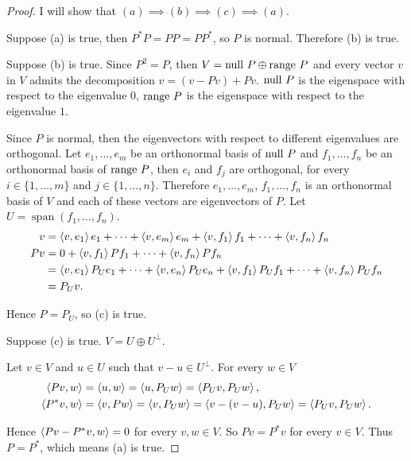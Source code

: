 \begin{proof}
    I will show that $(a) \implies (b) \implies (c) \implies (a)$.

    Suppose (a) is true, then $P^{*}P = PP = PP^{*}$, so $P$ is normal. Therefore (b) is true.

    Suppose (b) is true. Since $P^{2} = P$, then $V = \operatorname{null}\,{P}\oplus\operatorname{range}\,{P}$ and every vector $v$ in $V$ admits the decomposition $v = (v - Pv) + Pv$. $\operatorname{null}\,{P}$ is the eigenspace with respect to the eigenvalue $0$, $\operatorname{range}\,{P}$ is the eigenspace with respect to the eigenvalue $1$.

    Since $P$ is normal, then the eigenvectors with respect to different eigenvalues are orthogonal. Let $e_{1}, \ldots, e_{m}$ be an orthonormal basis of $\operatorname{null}\,{P}$ and $f_{1}, \ldots, f_{n}$ be an orthonormal basis of $\operatorname{range}\,{P}$, then $e_{i}$ and $f_{j}$ are orthogonal, for every $i\in\{1,\ldots, m\}$ and $j\in\{ 1,\ldots,n \}$. Therefore $e_{1}, \ldots, e_{m}$, $f_{1}, \ldots, f_{n}$ is an orthonormal basis of $V$ and each of these vectors are eigenvectors of $P$. Let $U = \operatorname{span}(f_{1}, \ldots, f_{n})$.
    \begin{align*}
        v  & = \left\langle{v,e_{1}}\right\rangle e_{1} + \cdots + \left\langle{v,e_{m}}\right\rangle e_{m} + \left\langle{v, f_{1}}\right\rangle f_{1} + \cdots + \left\langle{v, f_{n}}\right\rangle f_{n}                       \\
        Pv & = 0 + \left\langle{v, f_{1}}\right\rangle Pf_{1} + \cdots + \left\langle{v, f_{n}}\right\rangle Pf_{n}                                                                                \\
           & = \left\langle{v, e_{1}}\right\rangle P_{U}e_{1} + \cdots + \left\langle{v, e_{n}}\right\rangle P_{U}e_{n} + \left\langle{v, f_{1}}\right\rangle P_{U}f_{1} + \cdots + \left\langle{v, f_{n}}\right\rangle P_{U}f_{n} \\
           & = P_{U}v.
    \end{align*}

    Hence $P = P_{U}$, so (c) is true.

    Suppose (c) is true. $V = U\oplus U^{\bot}$.

    Let $v\in V$ and $u\in U$ such that $v - u\in U^{\bot}$. For every $w\in V$
    \begin{align*}
        \left\langle{Pv, w}\right\rangle     & = \left\langle{u, w}\right\rangle = \left\langle{u, P_{U}w}\right\rangle = \left\langle{P_{U}v, P_{U}w}\right\rangle,  \\
        \left\langle{P^{*}v, w}\right\rangle & = \left\langle{v, Pw}\right\rangle = \left\langle{v, P_{U}w}\right\rangle = \left\langle{v - (v - u), P_{U}w}\right\rangle = \left\langle{P_{U}v, P_{U}w}\right\rangle.
    \end{align*}

    Hence $\left\langle{Pv - P^{*}v, w}\right\rangle = 0$ for every $v, w\in V$. So $Pv = P^{*}v$ for every $v\in V$. Thus $P = P^{*}$, which means (a) is true.
\end{proof}
\newpage

